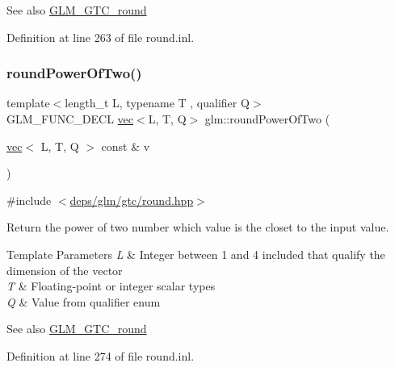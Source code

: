\begin{DoxySeeAlso}{See also}
\hyperlink{group__gtc__round}{G\+L\+M\+\_\+\+G\+T\+C\+\_\+round} 
\end{DoxySeeAlso}


Definition at line 263 of file round.\+inl.

\mbox{\label{group__gtc__round_ga258802a7d55c03c918f28cf4d241c4d0}} 
\subsubsection{\texorpdfstring{round\+Power\+Of\+Two()}{roundPowerOfTwo()}\hspace{0.1cm}{\footnotesize\ttfamily [2/2]}}
{\footnotesize\ttfamily template$<$length\+\_\+t L, typename T , qualifier Q$>$ \\
G\+L\+M\+\_\+\+F\+U\+N\+C\+\_\+\+D\+E\+CL \hyperlink{structglm_1_1vec}{vec}$<$L, T, Q$>$ glm\+::round\+Power\+Of\+Two (\begin{DoxyParamCaption}\item[{\hyperlink{structglm_1_1vec}{vec}$<$ L, T, Q $>$ const \&}]{v }\end{DoxyParamCaption})}



{\ttfamily \#include $<$\hyperlink{round_8hpp}{deps/glm/gtc/round.\+hpp}$>$}

Return the power of two number which value is the closet to the input value.


\begin{DoxyTemplParams}{Template Parameters}
{\em L} & Integer between 1 and 4 included that qualify the dimension of the vector \\
\hline
{\em T} & Floating-\/point or integer scalar types \\
\hline
{\em Q} & Value from qualifier enum\\
\hline
\end{DoxyTemplParams}
\begin{DoxySeeAlso}{See also}
\hyperlink{group__gtc__round}{G\+L\+M\+\_\+\+G\+T\+C\+\_\+round} 
\end{DoxySeeAlso}


Definition at line 274 of file round.\+inl.

